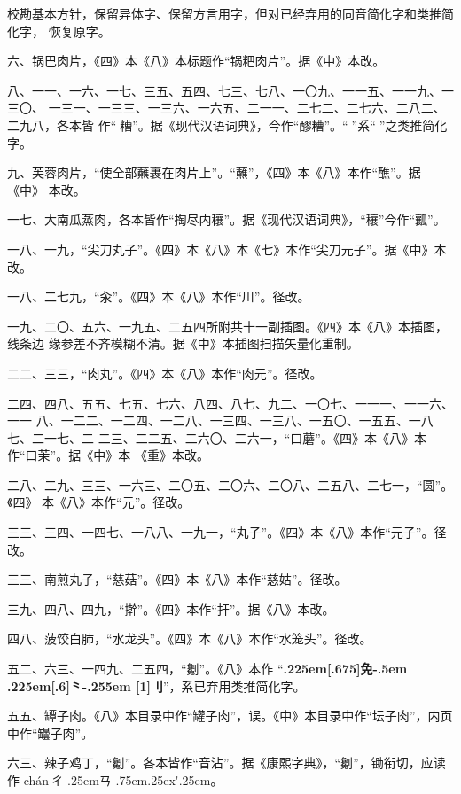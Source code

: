 校勘基本方针，保留异体字、保留方言用字，但对已经弃用的同音简化字和类推简化字，
恢复原字。

\vspace{1\baselineskip}

六、锅巴肉片，《四》本《八》本标题作“锅粑肉片”。据《中》本改。

八、一一、一六、一七、三五、五四、七三、七八、一〇九、一一五、一一九、一三〇、
一三一、一三三、一三六、一六五、二一一、二七二、二七六、二八二、二九八，各本皆
作“𰪿糟”。据《现代汉语词典》，今作“醪糟”。“𰪿”系“𫃑”之类推简化字。

九、芙蓉肉片，“使全部蘸裹在肉片上”。“蘸”，《四》本《八》本作“醮”。据《中》
本改。

一七、大南瓜蒸肉，各本皆作“掏尽内穰”。据《现代汉语词典》，“穰”今作“瓤”。

一八、一九，“尖刀丸子”。《四》本《八》本《七》本作“尖刀元子”。据《中》本改。

一八、二七九，“汆”。《四》本《八》本作“川”。径改。

一九、二〇、五六、一九五、二五四所附共十一副插图。《四》本《八》本插图，线条边
缘参差不齐模糊不清。据《中》本插图扫描矢量化重制。

二二、三三，“肉丸”。《四》本《八》本作“肉元”。径改。

二四、四八、五五、七五、七六、八四、八七、九二、一〇七、一一一、一一六、一一
八、一二二、一二四、一二八、一三四、一三八、一五〇、一五五、一八七、二一七、二
二三、二二五、二六〇、二六一，“口蘑”。《四》本《八》本作“口茉”。据《中》本
《重》本改。

二八、二九、三三、一六三、二〇五、二〇六、二〇八、二五八、二七一，“圆”。《四》
本《八》本作“元”。径改。

三三、三四、一四七、一八八、一九一，“丸子”。《四》本《八》本作“元子”。径改。

三三、南煎丸子，“慈菇”。《四》本《八》本作“慈姑”。径改。

三九、四八、四九，“擀”。《四》本作“扞”。据《八》本改。

四八、菠饺白肺，“水龙头”。《四》本《八》本作“水笼头”。径改。

五二、六三、一四九、二五四，“劖”。《八》本作
“{\bfseries\raise.225em\hbox{\scalebox{.6}[.675]{免}}\kern-.5em%
\lower.225em\hbox{\scalebox{.6}[.6]{⺀}}\kern-.255em%
\scalebox{.6}[1]{刂}}”，系已弃用类推简化字。

五五、罈子肉。《八》本目录中作“罐子肉”，误。《中》本目录中作“坛子肉”，内页
中作“罎子肉”。

六三、辣子鸡丁，“劖”。各本皆作“音沾”。据《康熙字典》，“劖”，锄衔切，应读作
{ch\'{a}n}\,{ㄔ\kern-.25emㄢ\kern-.75em\raise.25ex\hbox{\'{}}\kern.25em}。

